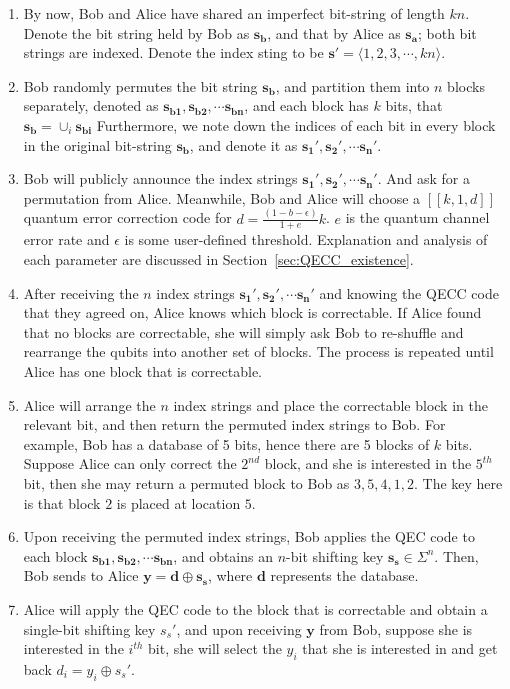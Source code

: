 \documentclass[%
 reprint,
superscriptaddress,
 amsmath,amssymb,
 aps,
]{revtex4-2}
\begin{document}
\begin{enumerate}
    \item By now, Bob and Alice have shared an imperfect bit-string of length $kn$. Denote the bit string held by Bob as $\mathbf{s_b}$, and that by Alice as $\mathbf{s_a}$; both bit strings are indexed. Denote the index sting to be $\mathbf{s'}=\langle1, 2, 3, \cdots, kn\rangle$.

    \item Bob randomly permutes the bit string $\mathbf{s_b}$, and partition them into $n$ blocks separately, denoted as $\mathbf{s_{b1}}, \mathbf{s_{b2}},\cdots \mathbf{s_{bn}}$, and each block has $k$ bits, that $\mathbf{s_b}=\cup_i \mathbf{s_{bi}}$ Furthermore, we note down the indices of each bit in every block in the original bit-string $\mathbf{s_b}$, and denote it as $\mathbf{s_{1}'}, \mathbf{s_{2}'},\cdots \mathbf{s_{n}'}$.

    \item Bob will publicly announce the index strings $\mathbf{s_1'}, \mathbf{s_2'},\cdots \mathbf{s_n'}$. And ask for a permutation from Alice. Meanwhile, Bob and Alice will choose a $[[k, 1, d]]$ quantum error correction code for $d=\frac{(1-b-\epsilon)}{1+e}k$. $e$ is the quantum channel error rate and $\epsilon$ is some user-defined threshold. Explanation and analysis of each parameter are discussed in Section~\ref{sec:QECC_existence}.

    \item After receiving the $n$ index strings $\mathbf{s_1'}, \mathbf{s_2'},\cdots \mathbf{s_n'}$ and knowing the QECC code that they agreed on, Alice knows which block is correctable. If Alice found that no blocks are correctable, she will simply ask Bob to re-shuffle and rearrange the qubits into another set of blocks. The process is repeated until Alice has one block that is correctable. 
    
    \item Alice will arrange the $n$ index strings and place the correctable block in the relevant bit, and then return the permuted index strings to Bob. For example, Bob has a database of 5 bits, hence there are 5 blocks of $k$ bits. Suppose Alice can only correct the $2^{nd}$ block, and she is interested in the $5^{th}$ bit, then she may return a permuted block to Bob as $3, 5, 4, 1, 2$. The key here is that block $2$ is placed at location $5$. 

    \item Upon receiving the permuted index strings, Bob applies the QEC code to each block $\mathbf{s_{b1}}, \mathbf{s_{b2}},\cdots \mathbf{s_{bn}}$, and obtains an $n$-bit shifting key $\mathbf{s_s}\in\Sigma^n$. Then, Bob sends to Alice $\mathbf{y}=\mathbf{d}\oplus\mathbf{s_s}$, where $\mathbf{d}$ represents the database.

    \item Alice will apply the QEC code to the block that is correctable and obtain a single-bit shifting key $s_s'$, and upon receiving $\mathbf{y}$ from Bob, suppose she is interested in the $i^{th}$ bit, she will select the $y_i$ that she is interested in and get back $d_i=y_i\oplus s_s'$.
    
\end{enumerate}
\end{document}
